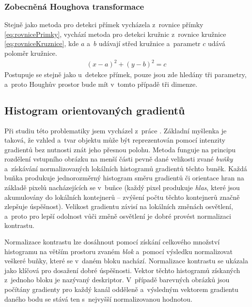 \subsubsection{Zobecněná Houghova transformace}
\label{zpusobyDetekceHoughtZobecnena}
Stejně jako metoda pro detekci přímek vycházela z~rovnice přímky \eqref{eq:rovnicePrimky}, vychází metoda pro detekci kružnic z~rovnice kružnice \eqref{eq:rovniceKruznice}, kde $a$ a~$b$ udávají střed kružnice a~parametr $c$ udává poloměr kružnice.
\begin{align}
    \label{eq:rovniceKruznice}
    (x - a)^2 + (y - b)^2 = c
\end{align}
Postupuje se stejně jako u~detekce přímek, pouze jsou zde hledány tři parametry, a~proto Houghův prostor bude mít v~tomto případě tři dimenze.

\subsection*{Histogram orientovaných gradientů}
Při studiu této problematiky jsem vycházel z~práce \cite{hog}. Základní myšlenka je taková, že vzhled a~tvar objektu může být reprezentován pomocí intenzity gradientů bez nutnosti znát jeho přesnou polohu. Metoda funguje na principu rozdělení vstupního obrázku na menší části pevně dané velikosti zvané \emph{buňky} a~získávání normalizovaných lokálních histogramů gradientů těchto buněk. Každá buňka produkuje jednorozměrný histogram směru gradientů či orientace hran na základě pixelů nacházejících se v~buňce (každý pixel produkuje \emph{hlas}, které jsou akumulovány do lokálních kontejnerů -- zvýšení počtu těchto kontejnerů značně zlepšuje úspěšnost). Velikost gradientu závisí na lokálních změnách osvětlení, a~proto pro lepší odolnost vůči změně osvětlení je dobré provést normalizaci kontrastu.

Normalizace kontrastu lze dosáhnout pomocí získání celkového množství  histogramu na větším prostoru zvaném \emph{blok} a~pomocí výsledku normalizovat veškeré buňky, které se v~daném bloku nachází. Normalizace kontrastu se ukázala jako klíčová pro dosažení dobré úspěšnosti. Vektor těchto histogramů získaných z~jednoho bloku je nazývaný deskriptor. V~případě barevných obrázků jsou počítány gradienty pro každý kanál odděleně a~výsledným vektorem gradientu daného bodu se stává ten s~nejvyšší normalizovanou hodnotou.




